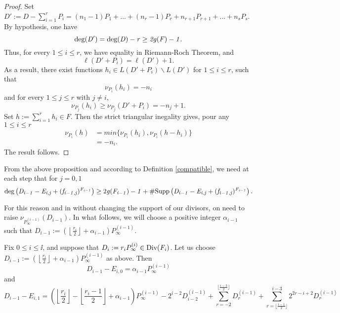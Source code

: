 \documentclass[10pt]{article}
\begin{document}
\begin{proof}
Set $D' := D - \sum\limits_{i=1}^r P_i = (n_1-1)P_1 + ... + (n_r-1)P_r + n_{r+1}P_{r+1} + ... + n_sP_s$. By hypothesis, one have 
\[\rm deg \it (D') = \rm deg \it (D) - r \geq 2g(F)-1.\]
Thus, for every $1 \leq i \leq r$, we have equality in Riemann-Roch Theorem, and 
\[\ell(D'+P_i) = \ell(D')+1.\] 
As a result, there exist functions $h_i \in L(D'+P_i)\backslash L(D')$ for $1 \leq i \leq r$, such that 
\[\nu_{P_i}(h_i) = -n_i\]
and for every $1 \leq j \leq r$ with $j \neq i$, 
\[\nu_{P_j}(h_i) \geq \nu_{P_j}(D'+P_i) = -n_j+1.\]
Set $h := \sum\limits_{i=1}^r h_i \in F$. Then the strict triangular inegality gives, pour any $1 \leq i \leq r$
\begin{align*}
\nu_{P_i}(h) &= min\{\nu_{P_i}(h_i),\nu_{P_i}(h-h_i)\} \\
	&= -n_i.
\end{align*}
The result follows.
\end{proof}

\s

From the above proposition and according to Definition \ref{compatible}, we need at each step that for $j=0,1$
\begin{equation} \label{only}
\rm deg \it \left(D_{i-1} - E_{i,j} + (f_{i-1,j})^{F_{i-1}}\right) \geq \rm 2 \it g(F_{i-1}) -1 + \#\rm Supp \it \left( D_{i-1} - E_{i,j} + (f_{i-1,j})^{F_{i-1}} \right).
\end{equation}

For this reason and in without changing the support of our divisors, on need to raise $\nu_{P_{\infty}^{(i-1)}}(D_{i-1})$. In what follows, we will choose a positive integer $\alpha_{i-1}$ such that $D_{i-1} := \left(\left \lfloor \frac{r_i}{2}\right\rfloor + \alpha_{i-1} \right) P_{\infty}^{(i-1)}$.

\s


\begin{lemma} \label{study diff}
Fix $0 \leq i \leq \ii$, and suppose that $D_i := r_i P_{\infty}^{(i)} \in \rm Div \it (F_i)$. Let us choose $D_{i-1} := \left(\left \lfloor \frac{r_i}{2}\right\rfloor + \alpha_{i-1} \right) P_{\infty}^{(i-1)}$ as above. Then
\[D_{i-1} - E_{i,0} = \alpha_{i-1} P_{\infty}^{(i-1)}\]
and 
\[D_{i-1} - E_{i,1} = \left( \left \lfloor \frac{r_i}{2}\right\rfloor - \left \lfloor \frac{r_i-1}{2}\right\rfloor + \alpha_{i-1} \right)  P_{\infty}^{(i-1)} - 2^{i-2}D_{i-2}^{(i-1)} + \sum\limits_{r=-2}^{\lfloor \frac{i-3}{2}\rfloor} D_r^{(i-1)} + \sum\limits_{r=\lfloor \frac{i-1}{2}\rfloor}^{i-3} 2^{2r-i+2}D_r^{(i-1)} \]
\end{lemma}
\end{document}
